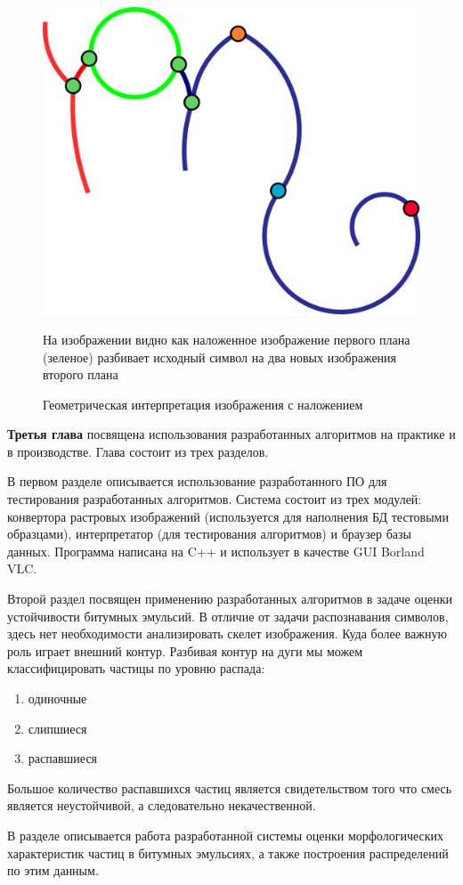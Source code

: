 \begin{enumerate}
\begin{figure}[h]
\centering
\includegraphics[width=0.55\linewidth,keepaspectratio]{images/overlaps}
\caption{Геометрическая интерпретация изображения с наложением}
\medskip
\small
На изображении видно как наложенное изображение первого плана (зеленое) разбивает исходный символ на два новых изображения второго плана
\end{figure}
\end{enumerate}

\textbf{Третья глава} посвящена использования разработанных алгоритмов на практике и в производстве. Глава состоит из трех разделов.

В первом разделе описывается использование разработанного ПО для тестирования разработанных алгоритмов. Система состоит из трех модулей: конвертора растровых изображений (используется для наполнения БД тестовыми образцами), интерпретатор (для тестирования алгоритмов) и браузер базы данных. Программа написана на C++ и использует в качестве GUI Borland VLC.

Второй раздел посвящен применению разработанных алгоритмов в задаче оценки устойчивости битумных эмульсий. В отличие от задачи распознавания символов, здесь нет необходимости анализировать скелет изображения. Куда более важную роль играет внешний контур. Разбивая контур на дуги мы можем классифицировать частицы по уровню распада:
\begin{enumerate}
\item одиночные
\item слипшиеся
\item распавшиеся
\end{enumerate}
Большое количество распавшихся частиц является свидетельством того что смесь является неустойчивой, а следовательно некачественной.

В разделе описывается работа разработанной системы оценки морфологических характеристик частиц в битумных эмульсиях, а также построения распределений по этим данным.

